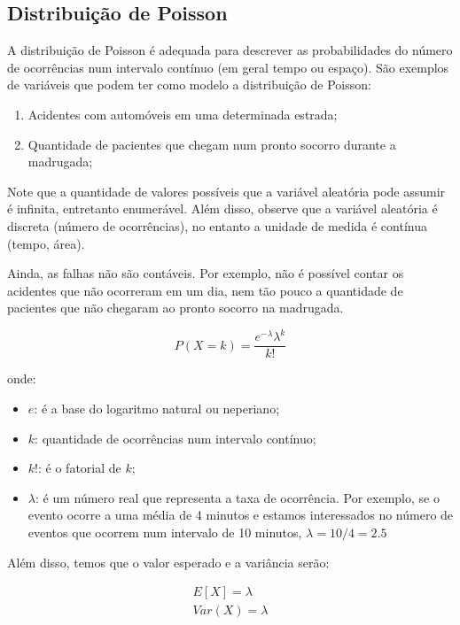  

\newpage
\subsection{Distribuição de Poisson}
  
\inic A distribuição de Poisson é adequada para descrever as probabilidades do número de ocorrências num intervalo contínuo (em geral tempo ou espaço). São exemplos de variáveis que podem ter como modelo
a distribuição de Poisson:

\begin{enumerate}
    \item Acidentes com automóveis em uma determinada estrada;
    \item Quantidade de pacientes que chegam num pronto socorro durante a madrugada;
\end{enumerate}
 
\inic Note que a quantidade de valores possíveis que a variável aleatória pode assumir é infinita, entretanto enumerável. Além disso, observe que a variável aleatória é discreta (número de ocorrências), no entanto a unidade de medida é contínua (tempo, área).\vskip0.3cm

Ainda, as falhas não são contáveis. Por exemplo, não é possível contar os acidentes que não ocorreram em um dia, nem tão pouco a quantidade de pacientes que não chegaram ao pronto socorro na madrugada.
 
 
\begin{equation}
    P\left(X=k\right)= \frac{e^{-\lambda}\lambda^{k}}{k!}
\end{equation}

onde:

\begin{itemize}
\item $e$: é a base do logaritmo natural ou neperiano;
\item $k$: quantidade de ocorrências num intervalo contínuo;
\item $k!$: é o fatorial de $k$; 
\item $\lambda$: é um número real que representa a taxa de ocorrência. Por exemplo, se o evento ocorre a uma média de 4 minutos e estamos interessados no número de eventos que ocorrem num intervalo de 10 minutos, $\lambda={10}/{4}=2.5$
\end{itemize}

  
Além disso, temos que o valor esperado e a variância serão: 

$$
\begin{aligned}
E\left[X\right] =\lambda \\
Var\left(X\right) = \lambda
\end{aligned}
$$
 


